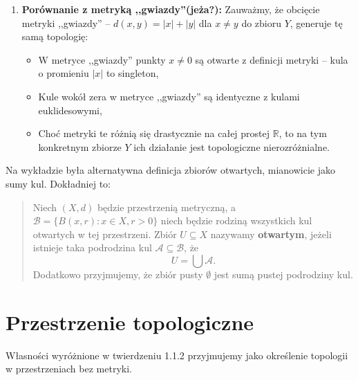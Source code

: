\begin{enumerate}[label=\arabic*)]
		\begin{itemize}
			\item \textbf{Dowolnych podzbiorów $Y\setminus \{0\} $ :} Ponieważ każdy punkt $\frac{1}{n}$ jest otwarty, każda suma takich punktów jest zbiorem otwartym.
			\item \textbf{Podzbiorów zawierających 0, których dopełnienie w $Y$ jest skończone :} Wynika to z faktu, że taki zbiór musi zawierać jakąś kulę wokół zera, a każda taka kula ,,wyrzuca'' poza siebie tylko skończoną liczbę punktów $\frac{1}{n}$. 
		\end{itemize}
	\item \textbf{Porównanie z metryką ,,gwiazdy''(jeża?):} Zauważmy, że obcięcie metryki ,,gwiazdy'' -- $d\left( x,y \right) = \left| x \right| + \left| y \right| $ dla $x \neq y$ do zbioru $Y$, generuje tę samą topologię:
		\begin{itemize}
			\item W metryce ,,gwiazdy'' punkty $x\neq 0$ są otwarte z definicji metryki -- kula o promieniu $\left| x \right| $ to singleton,
			\item Kule wokół zera w metryce ,,gwiazdy'' są identyczne z kulami euklidesowymi,
			\item Choć metryki te różnią się drastycznie na całej prostej $\mathbb{R}$, to na tym konkretnym zbiorze $Y$ ich działanie jest topologiczne nierozróżnialne.
		\end{itemize}
\end{enumerate}
\begin{remark}
	Na wykładzie była alternatywna definicja zbiorów otwartych, mianowicie jako sumy kul. Dokładniej to:

	\begin{quote}
		Niech $\left( X,d \right) $ będzie przestrzenią metryczną, a $\mathcal{B} = \{B\left( x,r \right) : x\in X, r>0\} $ niech będzie rodziną wszystkich kul otwartych w tej przestrzeni. Zbiór $U \subseteq X$ nazywamy \textbf{otwartym}, jeżeli istnieje taka podrodzina kul $\mathcal{A} \subseteq \mathcal{B}$, że \[
		U = \bigcup \mathcal{A}
		.\] 
		Dodatkowo przyjmujemy, że zbiór pusty $\emptyset$ jest sumą pustej podrodziny kul.
	\end{quote} 
\end{remark} 

\section{Przestrzenie topologiczne}
Własności wyróżnione w twierdzeniu 1.1.2 przyjmujemy jako określenie topologii w przestrzeniach bez metryki.

